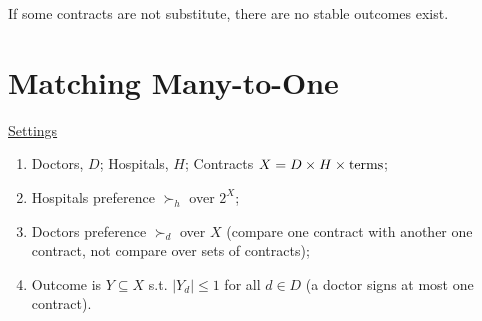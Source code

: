 \documentclass[11pt]{elegantbook}
\begin{document}














If some contracts are not substitute, there are no stable outcomes exist.

\section{Matching Many-to-One}
\underline{Settings}
\begin{enumerate}[$\circ$]
    \item Doctors, $D$; Hospitals, $H$; Contracts $X=D\times H\times \textnormal{terms}$;
    \item Hospitals preference $\succ_h$ over $2^X$;
    \item Doctors preference $\succ_d$ over $X$ (compare one contract with another one contract, not compare over sets of contracts);
    \item Outcome is $Y\subseteq X$ s.t. $|Y_d|\leq 1$ for all $d\in D$ (a doctor signs at most one contract).
\end{enumerate}
\end{document}
